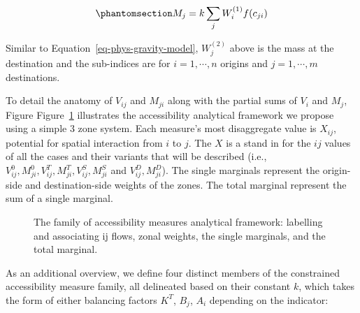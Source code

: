 \documentclass[
]{article}
\begin{document}
\begin{equation}\phantomsection\label{eq-market-potential-01}{
M_{j} = k \sum_j W_i^{(1)} f(c_{ji})
}\end{equation}

Similar to Equation~\ref{eq-phys-gravity-model}, \(W_j^{(2)}\) above is
the mass at the destination and the sub-indices are for
\(i = 1,\cdots, n\) origins and \(j = 1,\cdots, m\) destinations.

To detail the anatomy of \(V_{ij}\) and \(M_{ji}\) along with the
partial sums of \(V_i\) and \(M_j\), Figure
Figure~\ref{fig-analytical-device-conc-accessibility} illustrates the
accessibility analytical framework we propose using a simple 3 zone
system. Each measure's most disaggregate value is \(X_{ij}\), potential
for spatial interaction from \(i\) to \(j\). The \(X\) is a stand in for
the \(ij\) values of all the cases and their variants that will be
described (i.e.,
\(V_{ij}^0, M_{ji}^0, V_{ij}^T, M_{ji}^T, V_{ij}^S, M_{ji}^S\) and
\(V_{ij}^D, M_{ji}^D\)). The single marginals represent the origin-side
and destination-side weights of the zones. The total marginal represent
the sum of a single marginal.

\begin{figure}[H]


\caption{\label{fig-analytical-device-conc-accessibility}The family of
accessibility measures analytical framework: labelling and associating
ij flows, zonal weights, the single marginals, and the total marginal.}

\end{figure}%

As an additional overview, we define four distinct members of the
constrained accessibility measure family, all delineated based on their
constant \(k\), which takes the form of either balancing factors
\(K^T\), \(B_j\), \(A_i\) depending on the indicator:
\end{document}
